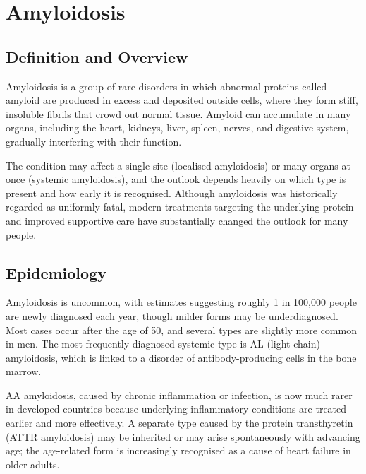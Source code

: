 \chapter{Amyloidosis}

\section*{Definition and Overview}
Amyloidosis is a group of rare disorders in which abnormal proteins called amyloid are produced in excess and deposited outside cells, where they form stiff, insoluble fibrils that crowd out normal tissue. Amyloid can accumulate in many organs, including the heart, kidneys, liver, spleen, nerves, and digestive system, gradually interfering with their function.

The condition may affect a single site (localised amyloidosis) or many organs at once (systemic amyloidosis), and the outlook depends heavily on which type is present and how early it is recognised. Although amyloidosis was historically regarded as uniformly fatal, modern treatments targeting the underlying protein and improved supportive care have substantially changed the outlook for many people.

\section*{Epidemiology}
Amyloidosis is uncommon, with estimates suggesting roughly 1 in 100,000 people are newly diagnosed each year, though milder forms may be underdiagnosed. Most cases occur after the age of 50, and several types are slightly more common in men. The most frequently diagnosed systemic type is AL (light-chain) amyloidosis, which is linked to a disorder of antibody-producing cells in the bone marrow.

AA amyloidosis, caused by chronic inflammation or infection, is now much rarer in developed countries because underlying inflammatory conditions are treated earlier and more effectively. A separate type caused by the protein transthyretin (ATTR amyloidosis) may be inherited or may arise spontaneously with advancing age; the age-related form is increasingly recognised as a cause of heart failure in older adults.

